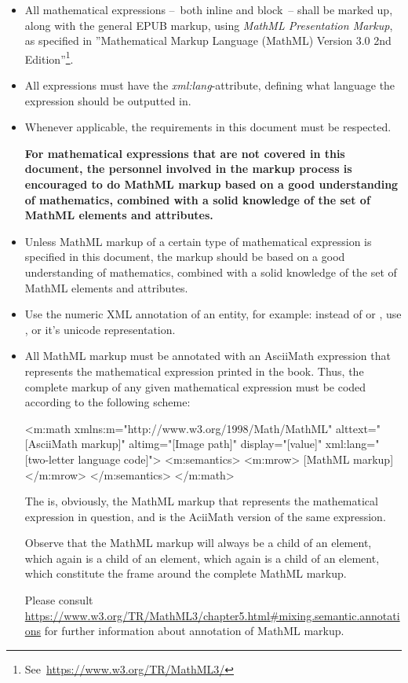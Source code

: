 \documentclass[english,a4paper,11pt]{article}
\begin{document}
\begin{itemize}
	\item All mathematical expressions --~both inline and block~-- shall be marked up, along with the general EPUB markup, using \emph{MathML Presentation Markup}, as specified in ''Mathematical Markup Language (MathML) Version 3.0 2nd Edition''\footnote{See~\url{https://www.w3.org/TR/MathML3/}}.
	\item All expressions must have the \emph{xml:lang}-attribute, defining what language the expression should be outputted in.
	\item Whenever applicable, the requirements in this document must be respected.
	
	\textbf{For mathematical expressions that are not covered in this document, the personnel involved in the markup process is encouraged to do MathML markup based on a good understanding of mathematics, combined with a solid knowledge of the set of MathML elements and attributes.}

	\item Unless MathML markup of a certain type of mathematical expression is specified in this document, the markup should be based on a good understanding of mathematics, combined with a solid knowledge of the set of MathML elements and attributes.
	\item Use the numeric XML annotation of an entity, for example: instead of  or , use , or it's unicode representation.
	\item All MathML markup must be annotated with an AsciiMath expression that represents the mathematical expression printed in the book. Thus, the complete markup of any given mathematical expression must be coded according to the following scheme:
	
\begin{kodeblokk}
\begin{verbatimtab}[3]
<m:math xmlns:m="http://www.w3.org/1998/Math/MathML"
	   alttext="[AsciiMath markup]" 
	   altimg="[Image path]" 
	   display="[value]"
	   xml:lang="[two-letter language code]">
	<m:semantics>
		<m:mrow>
			[MathML markup]
		</m:mrow>
	</m:semantics>
</m:math>
\end{verbatimtab}
\end{kodeblokk}
The  is, obviously, the MathML markup that represents the mathematical expression in question, and  is the AciiMath version of the same expression.

Observe that the MathML markup will always be a child of an  element, which again is a child of an  element, which again is a child of an  element, which constitute the frame around the complete MathML markup.

\bigskip
Please consult \url{https://www.w3.org/TR/MathML3/chapter5.html#mixing.semantic.annotations} for further information about annotation of MathML markup.
\end{itemize}
\end{document}
